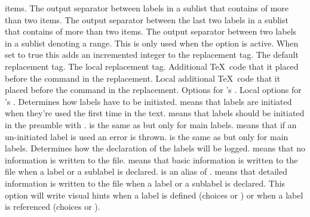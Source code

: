\documentclass[load-preamble+,babel-options={ngerman,british,american}]{cnltx-doc}
\begin{document}
\begin{options}
    items.
  \Default{,}
    The output separator between labels in a sublist that contains of more
    than two items.
  \Default{,}
    The output separator between the last two labels in a sublist that
    contains of more than two items.
  \Default{--}
    The output separator between two labels in a sublist denoting a range.
    This is only used when the option  is active.
    When set to true this adds an incremented integer to the replacement tag.
    The default replacement tag.
    The local replacement tag.
    Additional \TeX\ code that it placed before the  command in the
    replacement.
    Local additional \TeX\ code that it placed before the  command in
    the replacement.
    Options for 's .
    Local options for 's .
    Determines how labels have to be initiated.   means that
    labels are initiated when they're used the first time in the text.
     means that labels should be initiated in the preamble with
    .   is the same as  but only for main
    labels.   means that if an un-initiated label is used an
    error is thrown.   is the same as  but only
    for main labels.
    Determines how the declaration of the labels will be logged.  
    means that no information is written to the  file.  
    means that basic information is written to the  file when a
    label or a sublabel is declared.   is an alias of
    .   means that detailed information is written to
    the  file when a label or a sublabel is declared.
    This option will write visual hints when a label is defined (choices
     or ) or when a label is referenced (choices
     or ).
\end{options}
\end{document}

